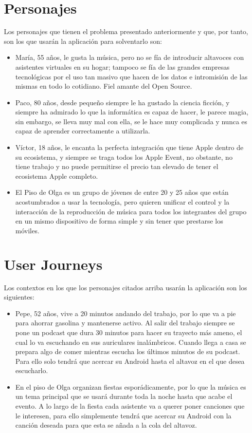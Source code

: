 \section{Personajes}
Los personajes que tienen el problema presentado anteriormente y que, por tanto,
son los que usarán la aplicación para solventarlo son:
\begin{itemize}
    \item María, 55 años, le gusta la música, pero no se fía de introducir
    altavoces con asistentes virtuales en su hogar; tampoco se fía de las
    grandes empresas tecnológicas por el uso tan masivo que hacen de los datos e
    intromisión de las mismas en todo lo cotidiano. Fiel amante del Open Source.
    \item Paco, 80 años, desde pequeño siempre le ha gustado la ciencia ficción,
    y siempre ha admirado lo que la informática es capaz de hacer, le parece
    magia, sin embargo, se lleva muy mal con ella, se le hace muy complicada y
    nunca es capaz de aprender correctamente a utilizarla.
    \item Víctor, 18 años, le encanta la perfecta integración que tiene Apple
    dentro de su ecosistema, y siempre se traga todos los Apple Event, no
    obstante, no tiene trabajo y no puede permitirse el precio tan elevado de
    tener el ecosistema Apple completo.
    \item El Piso de Olga es un grupo de jóvenes de entre 20 y 25 años que están
    acostumbrados a usar la tecnología, pero quieren unificar el control y la
    interacción de la reproducción de música para todos los integrantes del
    grupo en un mismo dispositivo de forma simple y sin tener que prestarse los
    móviles.
\end{itemize}

\section{User Journeys}
Los contextos en los que los personajes citados arriba usarán la aplicación son
los siguientes:\\

\begin{itemize}
    \item Pepe, 52 años, vive a 20 minutos andando del trabajo, por lo que va a
    pie para ahorrar gasolina y mantenerse activo. Al salir del trabajo siempre
    se pone un podcast que dura 30 minutos para hacer su trayecto más ameno, el
    cual lo va escuchando en sus auriculares inalámbricos. Cuando llega a casa
    se prepara algo de comer mientras escucha los últimos minutos de su podcast.
    Para ello solo tendrá que acercar su Android hasta el altavoz en el que
    desea escucharlo.
    \item En el piso de Olga organizan fiestas esporádicamente, por lo que la
    música es un tema principal que se usará durante toda la noche hasta que
    acabe el evento. A lo largo de la fiesta cada asistente va a querer poner
    canciones que le interesen, para ello simplemente tendrá que acercar su
    Android con la canción deseada para que esta se añada a la cola del altavoz.
\end{itemize}


